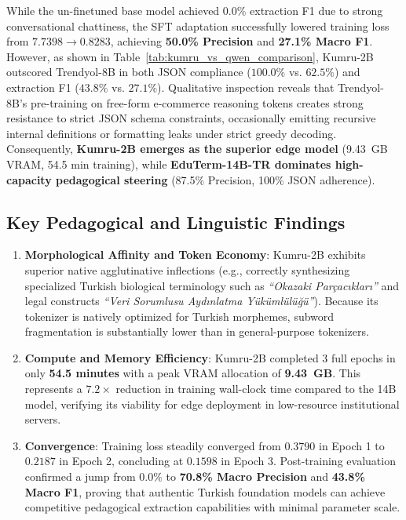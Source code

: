 \documentclass[a4paper,12pt]{report}
\begin{document}
While the un-finetuned base model achieved $0.0\%$ extraction F1 due to strong conversational chattiness, the SFT adaptation successfully lowered training loss from $7.7398 \to 0.8283$, achieving \textbf{50.0\% Precision} and \textbf{27.1\% Macro F1}. However, as shown in Table~\ref{tab:kumru_vs_qwen_comparison}, Kumru-2B outscored Trendyol-8B in both JSON compliance ($100.0\%$ vs. $62.5\%$) and extraction F1 ($43.8\%$ vs. $27.1\%$). Qualitative inspection reveals that Trendyol-8B's pre-training on free-form e-commerce reasoning tokens creates strong resistance to strict JSON schema constraints, occasionally emitting recursive internal definitions or formatting leaks under strict greedy decoding. Consequently, \textbf{Kumru-2B emerges as the superior edge model} (9.43~GB VRAM, 54.5 min training), while \textbf{EduTerm-14B-TR dominates high-capacity pedagogical steering} (87.5\% Precision, 100\% JSON adherence).

\subsection{Key Pedagogical and Linguistic Findings}
\begin{enumerate}[leftmargin=2.5em]
    \item \textbf{Morphological Affinity and Token Economy}: Kumru-2B exhibits superior native agglutinative inflections (e.g., correctly synthesizing specialized Turkish biological terminology such as \textit{``Okazaki Parçacıkları''} and legal constructs \textit{``Veri Sorumlusu Aydınlatma Yükümlülüğü''}). Because its tokenizer is natively optimized for Turkish morphemes, subword fragmentation is substantially lower than in general-purpose tokenizers.
    \item \textbf{Compute and Memory Efficiency}: Kumru-2B completed 3 full epochs in only \textbf{54.5 minutes} with a peak VRAM allocation of \textbf{9.43~GB}. This represents a $\mathbf{7.2\times}$ reduction in training wall-clock time compared to the 14B model, verifying its viability for edge deployment in low-resource institutional servers.
    \item \textbf{Convergence}: Training loss steadily converged from $0.3790$ in Epoch 1 to $0.2187$ in Epoch 2, concluding at $0.1598$ in Epoch 3. Post-training evaluation confirmed a jump from $0.0\%$ to \textbf{70.8\% Macro Precision} and \textbf{43.8\% Macro F1}, proving that authentic Turkish foundation models can achieve competitive pedagogical extraction capabilities with minimal parameter scale.
\end{enumerate}
\end{document}
